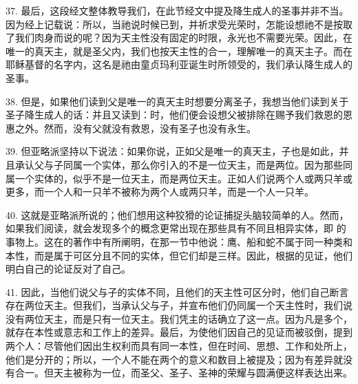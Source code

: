 37. 最后，这段经文整体教导我们，在此节经文中提及降生成人的圣事并非不当。因为经上记载说：所以，当祂说时候已到，并祈求受光荣时，怎能设想祂不是按取了我们肉身而说的呢？因为天主性没有固定的时限，永光也不需要光荣。因此，在唯一的真天主，就是圣父内，我们也按天主性的合一，理解唯一的真天主子。而在耶稣基督的名字内，这名是祂由童贞玛利亚诞生时所领受的，我们承认降生成人的圣事。\par

38. 但是，如果他们读到父是唯一的真天主时想要分离圣子，我想当他们读到关于圣子降生成人的话：并且又读到：时，他们便会设想父被排除在赐予我们救恩的恩惠之外。然而，没有父就没有救恩，没有圣子也没有永生。\par

\par

39. 但亚略派坚持以下说法：如果你说，正如父是唯一的真天主，子也是如此，并且承认父与子同属一个实体，那么你引入的不是一位天主，而是两位。因为那些同属一个实体的，似乎不是一位天主，而是两位天主。正如人们说两个人或两只羊或更多，而一个人和一只羊不被称为两个人或两只羊，而是一个人一只羊。\par

40. 这就是亚略派所说的；他们想用这种狡猾的论证捕捉头脑较简单的人。然而，如果我们阅读，就会发现多个的概念更常出现在那些具有不同且相异实体，即  的事物上。这在的著作中有所阐明，在那一节中他说：鹰、船和蛇不属于同一种类和本性，而是属于可区分且不同的实体，但它们却是三样。因此，根据的见证，他们明白自己的论证反对了自己。\par

41. 因此，当他们说父与子的实体不同，且他们的天主性可区分时，他们自己断言存在两位天主。但我们，当承认父与子，并宣布他们仍同属一个天主性时，我们说没有两位天主，而是只有一位天主。我们凭主的话确立了这一点。因为凡是多个，就存在本性或意志和工作上的差异。最后，为使他们因自己的见证而被驳倒，提到两个人：尽管他们因出生权利而具有同一本性，但在时间、思想、工作和处所上，他们是分开的；所以，一个人不能在两个的意义和数目上被提及；因为有差异就没有合一。但天主被称为一位，而圣父、圣子、圣神的荣耀与圆满便这样表达出来。\par

